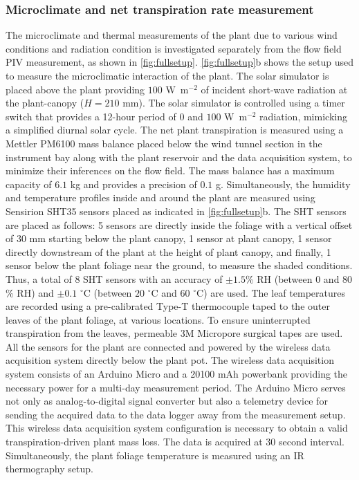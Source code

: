 \subsubsection*{Microclimate and net transpiration rate measurement}
The microclimate and thermal measurements of the plant due to various wind conditions and radiation condition is investigated separately from the flow field PIV measurement, as shown in \cref{fig:fullsetup}. \cref{fig:fullsetup}b shows the setup used to measure the microclimatic interaction of the plant. The solar simulator is placed above the plant providing $100$ W~m$^{-2}$ of incident short-wave radiation at the plant-canopy ($H=210$ mm). The solar simulator is controlled using a timer switch that provides a 12-hour period of $0$ and $100$ W~m$^{-2}$ radiation, mimicking a simplified diurnal solar cycle. The net plant transpiration is measured using a Mettler PM6100 mass balance placed below the wind tunnel section in the instrument bay along with the plant reservoir and the data acquisition system, to minimize their inferences on the flow field. The mass balance has a maximum capacity of $6.1$ kg and provides a precision of $0.1$ g. Simultaneously, the humidity and temperature profiles inside and around the plant are measured using Sensirion SHT35 sensors placed as indicated in \cref{fig:fullsetup}b. The SHT sensors are placed as follows: 5 sensors are directly inside the foliage with a vertical offset of $30$ mm starting below the plant canopy, 1 sensor at plant canopy, 1 sensor directly downstream of the plant at the height of plant canopy, and finally, 1 sensor below the plant foliage near the ground, to measure the shaded conditions. Thus, a total of 8 SHT sensors with an accuracy of $\pm 1.5$\% RH (between $0$ and $80$\% RH) and $\pm 0.1$ $^{\circ}$C (between $20$ $^{\circ}$C and $60$ $^{\circ}$C) are used. The leaf temperatures are recorded using a pre-calibrated Type-T thermocouple taped to the outer leaves of the plant foliage, at various locations. To ensure uninterrupted transpiration from the leaves, permeable 3M Micropore surgical tapes are used. All the sensors for the plant are connected and powered by the wireless data acquisition system directly below the plant pot. The wireless data acquisition system consists of an Arduino Micro and a \num{20100} mAh powerbank providing the necessary power for a multi-day measurement period. The Arduino Micro serves not only as analog-to-digital signal converter but also a telemetry device for sending the acquired data to the data logger away from the measurement setup. This wireless data acquisition system configuration is necessary to obtain a valid transpiration-driven plant mass loss. The data is acquired at $30$ second interval. Simultaneously, the plant foliage temperature is measured using an IR thermography setup.

